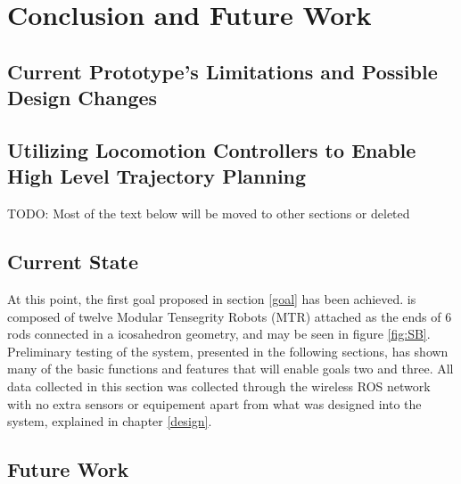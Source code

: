\chapter{Conclusion and Future Work}
\label{conclusion}

\color{red}
\section{Current Prototype's Limitations and Possible Design Changes}

\section{Utilizing Locomotion Controllers to Enable High Level Trajectory Planning}


\color{blue}
TODO: Most of the text below will be moved to other sections or deleted 

\section{\SB{} Current State}
At this point, the first goal proposed in section \ref{goal} has been achieved.
\SB{} is composed of twelve Modular Tensegrity Robots (MTR) attached as the ends of 6 rods connected in a icosahedron geometry, and may be seen in figure \ref{fig:SB}.
Preliminary testing of the system, presented in the following sections, has shown many of the basic functions and features that will enable goals two and three.
All data collected in this section was collected through the wireless ROS network with no extra sensors or equipement apart from what was designed into the system, explained in chapter \ref{design}. 

\section{Future Work}


